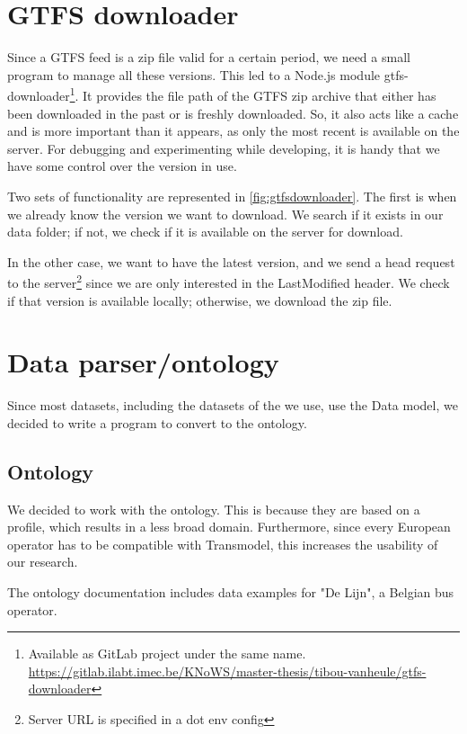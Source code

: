 \section{GTFS downloader}
\label{section:gtfsdownloader}
Since a GTFS feed is a zip file valid for a certain period, we need a small program to manage all these versions. This led to a Node.js module gtfs-downloader\footnote{Available as GitLab project under the same name. \\\url{https://gitlab.ilabt.imec.be/KNoWS/master-thesis/tibou-vanheule/gtfs-downloader}}. It provides the file path of the GTFS zip archive that either has been downloaded in the past or is freshly downloaded. So, it also acts like a cache and is more important than it appears, as only the most recent is available on the server. For debugging and experimenting while developing, it is handy that we have some control over the version in use. 

Two sets of functionality are represented in \autoref{fig:gtfsdownloader}. The first is when we already know the version we want to download. We search if it exists in our data folder; if not, we check if it is available on the server for download.

In the other case, we want to have the latest version, and we send a head request to the server\footnote{Server URL is specified in a dot env config} since we are only interested in the LastModified header. We check if that version is available locally; otherwise, we download the zip file.

\section{Data parser/ontology}\label{section:implementation_data_ontology}
Since most datasets, including the datasets of the  we use, use the  Data model, we decided to write a program to convert  to the  ontology.
\subsection{Ontology}
We decided to work with the  ontology. This is because they are based on a  profile, which results in a less broad domain. Furthermore, since every European operator has to be compatible with Transmodel, this increases the usability of our research.

The ontology documentation includes data examples for "De Lijn", a Belgian bus operator. 

